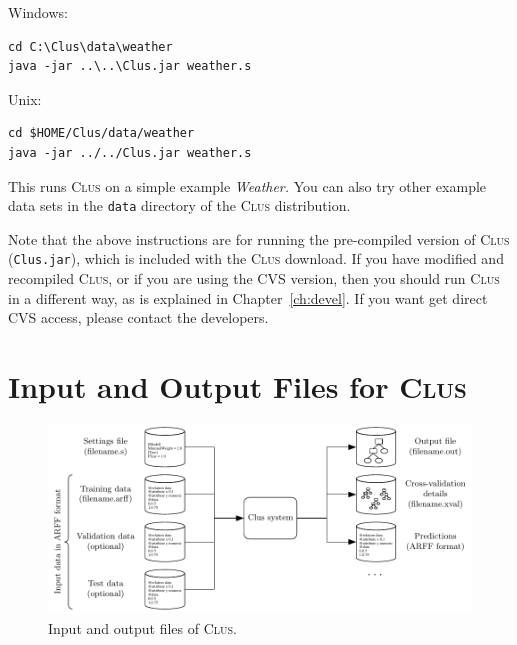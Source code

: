 \documentclass[a4paper]{report}
\newcommand{\clus}{\textsc{Clus}}
\begin{document}
\begin{list}{}{\leftmargin=1.5cm}
\item[Windows:]\mbox{}
\begin{verbatim}
cd C:\Clus\data\weather
java -jar ..\..\Clus.jar weather.s
\end{verbatim}

\item[Unix:]\mbox{}
\begin{verbatim}
cd $HOME/Clus/data/weather
java -jar ../../Clus.jar weather.s
\end{verbatim}
\end{list}

\noindent{}This runs \clus{} on a simple example \emph{Weather.} You can also try other example data sets in the \texttt{data} directory of the \clus{} distribution.

Note that the above instructions are for running the pre-compiled version of \clus{} (\texttt{Clus.jar}), which is included with the \clus{} download. If you have modified and recompiled \clus{}, or if you are using the CVS version, then you should run \clus{} in a different way, as is explained in Chapter~\ref{ch:devel}. If you want get direct CVS access, please contact the developers.

\section{Input and Output Files for \clus}

\begin{figure}%
\includegraphics{fig/clusinout}
\caption{\label{fig:iofiles}Input and output files of \clus.}
\end{figure}
\end{document}
